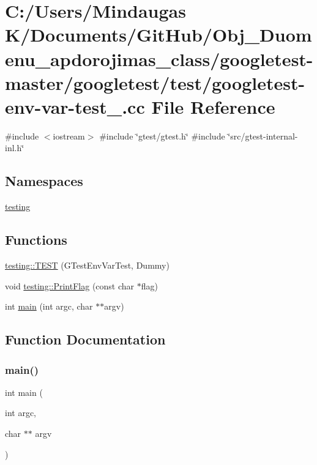 \hypertarget{googletest-master_2googletest_2test_2googletest-env-var-test___8cc}{}\section{C\+:/\+Users/\+Mindaugas K/\+Documents/\+Git\+Hub/\+Obj\+\_\+\+Duomenu\+\_\+apdorojimas\+\_\+class/googletest-\/master/googletest/test/googletest-\/env-\/var-\/test\+\_\+.cc File Reference}
\label{googletest-master_2googletest_2test_2googletest-env-var-test___8cc}
{\ttfamily \#include $<$iostream$>$}\newline
{\ttfamily \#include \char`\"{}gtest/gtest.\+h\char`\"{}}\newline
{\ttfamily \#include \char`\"{}src/gtest-\/internal-\/inl.\+h\char`\"{}}\newline
\subsection*{Namespaces}
\begin{DoxyCompactItemize}
\item 
 \mbox{\hyperlink{namespacetesting}{testing}}
\end{DoxyCompactItemize}
\subsection*{Functions}
\begin{DoxyCompactItemize}
\item 
\mbox{\hyperlink{namespacetesting_af4187d1b48a2812f1335721ed8f30a99}{testing\+::\+T\+E\+ST}} (G\+Test\+Env\+Var\+Test, Dummy)
\item 
void \mbox{\hyperlink{namespacetesting_a9863402455bfcf9be5fc0b1453a6d97d}{testing\+::\+Print\+Flag}} (const char $\ast$flag)
\item 
int \mbox{\hyperlink{googletest-master_2googletest_2test_2googletest-env-var-test___8cc_a3c04138a5bfe5d72780bb7e82a18e627}{main}} (int argc, char $\ast$$\ast$argv)
\end{DoxyCompactItemize}


\subsection{Function Documentation}
\mbox{\label{googletest-master_2googletest_2test_2googletest-env-var-test___8cc_a3c04138a5bfe5d72780bb7e82a18e627}} 
\subsubsection{\texorpdfstring{main()}{main()}}
{\footnotesize\ttfamily int main (\begin{DoxyParamCaption}\item[{int}]{argc,  }\item[{char $\ast$$\ast$}]{argv }\end{DoxyParamCaption})}

